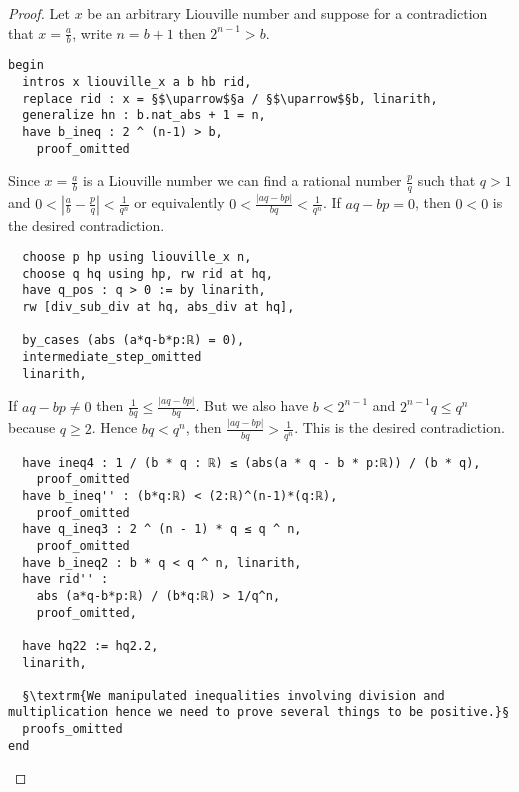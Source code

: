 \documentclass{report}
\theoremstyle{definition}
\theoremstyle{plain}
\begin{document}
\begin{proof}
Let $x$ be an arbitrary Liouville number and suppose for a contradiction that $x=\frac ab$, write $n=b+1$ then $2^{n-1}>b$.
\begin{verbatim}
begin
  intros x liouville_x a b hb rid, 
  replace rid : x = §$\uparrow$§a / §$\uparrow$§b, linarith,
  generalize hn : b.nat_abs + 1 = n,
  have b_ineq : 2 ^ (n-1) > b,
    proof_omitted
\end{verbatim}

Since $x=\frac ab$ is a Liouville number we can find a rational number $\frac pq$ such that $q>1$ and $0<\left|\frac ab-\frac pq\right|<\frac1{q^n}$ or equivalently $0<\frac{\left|aq-bp\right|}{bq}<\frac1{q^n}$. If $aq-bp=0$, then $0<0$ is the desired contradiction.

\begin{verbatim} 
  choose p hp using liouville_x n,
  choose q hq using hp, rw rid at hq,
  have q_pos : q > 0 := by linarith, 
  rw [div_sub_div at hq, abs_div at hq],

  by_cases (abs (a*q-b*p:ℝ) = 0),
  intermediate_step_omitted
  linarith,
\end{verbatim}

If $aq-bp\ne 0$ then $\frac 1{bq}\le\frac{\left|aq-bp\right|}{bq}$. But we also have $b<2^{n-1}$ and $2^{n-1}q\le q^n$ because $q\ge 2$. Hence $bq<q^n$, then $\frac{\left|aq-bp\right|}{bq}>\frac1{q^n}$. This is the desired contradiction.

\begin{verbatim} 
  have ineq4 : 1 / (b * q : ℝ) ≤ (abs(a * q - b * p:ℝ)) / (b * q),
    proof_omitted
  have b_ineq'' : (b*q:ℝ) < (2:ℝ)^(n-1)*(q:ℝ), 
    proof_omitted
  have q_ineq3 : 2 ^ (n - 1) * q ≤ q ^ n,
    proof_omitted
  have b_ineq2 : b * q < q ^ n, linarith,
  have rid'' : 
    abs (a*q-b*p:ℝ) / (b*q:ℝ) > 1/q^n,
    proof_omitted,
  
  have hq22 := hq2.2,
  linarith,

  §\textrm{We manipulated inequalities involving division and multiplication hence we need to prove several things to be positive.}§
  proofs_omitted
end
\end{verbatim}
\end{proof}
\end{document}
